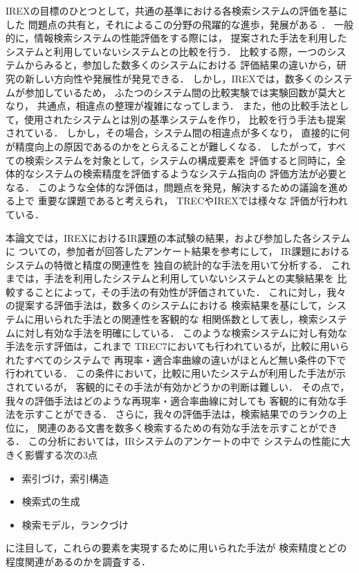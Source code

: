 IREXの目標のひとつとして，共通の基準における各検索システムの評価を基にした
問題点の共有と，それによるこの分野の飛躍的な進歩，発展がある
\cite{sekine99}．
一般的に，情報検索システムの性能評価をする際には，
提案された手法を利用したシステムと利用していないシステムとの比較を行う．
比較する際，一つのシステムからみると，参加した数多くのシステムにおける
評価結果の違いから，研究の新しい方向性や発展性が発見できる．
しかし，IREXでは，数多くのシステムが参加しているため，
ふたつのシステム間の比較実験では実験回数が莫大となり，
共通点，相違点の整理が複雑になってしまう．
また，他の比較手法として，使用されたシステムとは別の基準システムを作り，
比較を行う手法も提案されている\cite{Hull93}．
しかし，その場合，システム間の相違点が多くなり，
直接的に何が精度向上の原因であるのかをとらえることが難しくなる．
したがって，すべての検索システムを対象として，システムの構成要素を
評価すると同時に，全体的なシステムの検索精度を評価するようなシステム指向の
評価方法が必要となる．
このような全体的な評価は，問題点を発見，解決するための議論を進める上で
重要な課題であると考えられ，
TRECやIREXでは様々な
評価が行われている\cite{Lagergren98}\cite{Voorhees98SIGIR}\cite{Matuo99}．

本論文では，IREXにおけるIR課題の本試験の結果，および参加した各システムに
ついての，参加者が回答したアンケート結果を参考にして，
IR課題におけるシステムの特徴と精度の関連性を
独自の統計的な手法を用いて分析する．
これまでは，手法を利用したシステムと利用していないシステムとの実験結果を
比較することによって，その手法の有効性が評価されていた．
これに対し，我々の提案する評価手法は，数多くのシステムにおける
検索結果を基にして，システムに用いられた手法との関連性を客観的な
相関係数として表し，検索システムに対し有効な手法を明確にしている．
このような検索システムに対し有効な手法を示す評価は，これまで
TREC7においても行われているが，比較に用いられたすべてのシステムで
再現率・適合率曲線の違いがほとんど無い条件の下で行われている\cite{Voorhees98}．
この条件において，比較に用いたシステムが利用した手法が示されているが，
客観的にその手法が有効かどうかの判断は難しい．
その点で，我々の評価手法はどのような再現率・適合率曲線に対しても
客観的に有効な手法を示すことができる．
さらに，我々の評価手法は，検索結果でのランクの上位に，
関連のある文書を数多く検索するための有効な手法を示すことができる．
この分析においては，IRシステムのアンケートの中で
システムの性能に大きく影響する次の3点
\begin{itemize}
\item 索引づけ，索引構造
\item 検索式の生成
\item 検索モデル，ランクづけ
\end{itemize}
に注目して，これらの要素を実現するために用いられた手法が
検索精度とどの程度関連があるのかを調査する．

